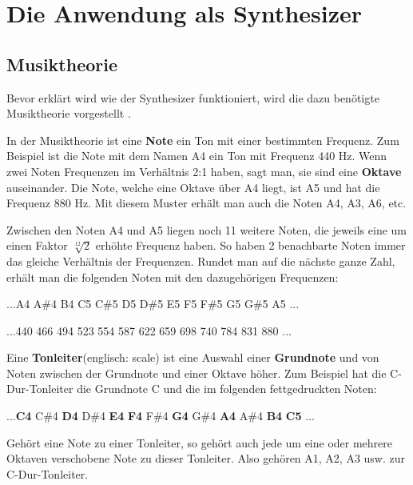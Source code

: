 \section{Die Anwendung als Synthesizer}
\label{chap:synth}

\subsection{Musiktheorie}
\label{chap:music_theorie}

Bevor erklärt wird wie der Synthesizer funktioniert, wird die dazu benötigte 
Musiktheorie vorgestellt \cite{hewitt2008music}. 

In der Musiktheorie ist eine \textbf{Note} ein Ton mit einer bestimmten Frequenz.
Zum Beispiel ist die Note mit dem Namen A4 ein Ton mit Frequenz 440 Hz.
Wenn zwei Noten Frequenzen im Verhältnis 2:1 haben, sagt man, sie sind
eine \textbf{Oktave} auseinander. Die Note, welche eine Oktave über A4 liegt,
ist A5 und hat die Frequenz 880 Hz. Mit diesem Muster erhält man auch die
Noten A4, A3, A6, etc.

Zwischen den Noten A4 und A5 liegen noch 11 weitere Noten, die jeweils eine 
um einen Faktor $\sqrt[12]{2}$ erhöhte Frequenz haben.
So haben 2 benachbarte Noten immer das gleiche Verhältnis der Frequenzen. Rundet man
auf die nächste ganze Zahl,
erhält man die folgenden Noten mit den dazugehörigen Frequenzen: 
\begin{center}
\hfill...\hfill A4 \hfill A\#4 \hfill B4 \hfill C5 \hfill C\#5 \hfill D5 \hfill D\#5 \hfill E5 \hfill F5 \hfill F\#5 \hfill G5 \hfill G\#5 \hfill A5 \hfill ... \hfill

\hfill...\hfill 440 \hfill 466 \hfill 494 \hfill 523 \hfill 554 \hfill 587 \hfill 622 \hfill 659 \hfill 698 \hfill 740 \hfill 784 \hfill 831 \hfill 880 \hfill ... \hfill
\end{center}

Eine \textbf{Tonleiter}(englisch: scale) ist eine Auswahl einer \textbf{Grundnote} und von Noten
zwischen der Grundnote und einer Oktave höher.
Zum Beispiel hat die C-Dur-Tonleiter die Grundnote C und die im folgenden 
fettgedruckten Noten:
\begin{center}
\hfill...\hfill \textbf{C4} \hfill C\#4 \hfill \textbf{D4} \hfill D\#4 
\hfill \textbf{E4} \hfill \textbf{F4} \hfill F\#4 \hfill \textbf{G4} 
\hfill G\#4 \hfill \textbf{A4} \hfill A\#4 \hfill \textbf{B4} \hfill \textbf{C5} 
\hfill ... \hfill
\end{center}

Gehört eine Note zu einer Tonleiter, so gehört auch jede um eine oder mehrere 
Oktaven verschobene Note zu dieser Tonleiter. Also gehören A1, A2, A3 usw.
zur C-Dur-Tonleiter.

